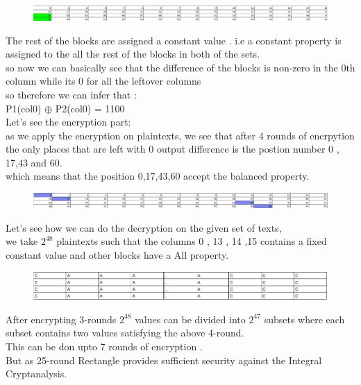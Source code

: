 \documentclass[journal=tosc,preprint]{iacrtrans}
\begin{document}
\begin{figure}[htp]
    \centering
    \includegraphics[width=16cm]{img_5.png}
\end{figure}

The rest of the blocks are assigned a constant value . i.e a constant property is assigned to the all the rest of the blocks in both of the sets.\\
so now we can basically see that the difference of the blocks is non-zero in the 0th column while its 0 for all the leftover columns\\
so therefore we can infer that :\\
P1(col0) $\oplus$ P2(col0) = 1100\\
Let's see the encryption part:\\
as we apply the encryption on plaintexts, we see that after 4 rounds of encrpytion the only places that are left with 0 output difference is the postion number 0 , 17,43 and 60.\\
which means that the position 0,17,43,60 accept the balanced property. \\


\begin{figure}[htp]
    \centering
    \includegraphics[width=16cm]{img_6.png}
\end{figure}


\vspace{1cm}
Let's see how we can do the decryption on the given set of texts,\\
we take $2^{48}$ plaintexts such that the columns 0 , 13 , 14 ,15 contains a fixed constant value and other blocks have a All property.\\

\begin{figure}[htp]
    \centering
    \includegraphics[width=12cm]{img_7.png}
\end{figure}

After encrypting 3-rounds $2^{48}$ values can be divided into $2^{47}$ subsets where each subset contains two values satisfying the above 4-round.\\
This can be don upto 7 rounds of encryption .\\
But as 25-round Rectangle provides sufficient security against the Integral Cryptanalysis.
\end{document}
